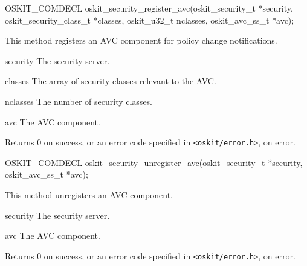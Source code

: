 \begin{apisyn}

	\funcproto OSKIT_COMDECL
	oskit_security_register_avc(oskit_security_t *security, 
			  oskit_security_class_t *classes,
			  oskit_u32_t nclasses,
			  oskit_avc_ss_t *avc);

\end{apisyn}
\begin{apidesc}

	This method registers an AVC component for policy change
	notifications.  

\end{apidesc}
\begin{apiparm}
	\item[security]
		The security server.
	\item[classes]
		The array of security classes relevant to the AVC.
	\item[nclasses]
		The number of security classes.
	\item[avc]
		The AVC component.
\end{apiparm}
\begin{apiret}
	Returns 0 on success, or an error code specified in
	{\tt <oskit/error.h>}, on error.
\end{apiret}


\begin{apisyn}

	\funcproto OSKIT_COMDECL
	oskit_security_unregister_avc(oskit_security_t *security, 
	  			  oskit_avc_ss_t *avc);

\end{apisyn}
\begin{apidesc}
	This method unregisters an AVC component.
\end{apidesc}
\begin{apiparm}
	\item[security]
		The security server.
	\item[avc]
		The AVC component.
\end{apiparm}
\begin{apiret}
	Returns 0 on success, or an error code specified in
	{\tt <oskit/error.h>}, on error.
\end{apiret}


